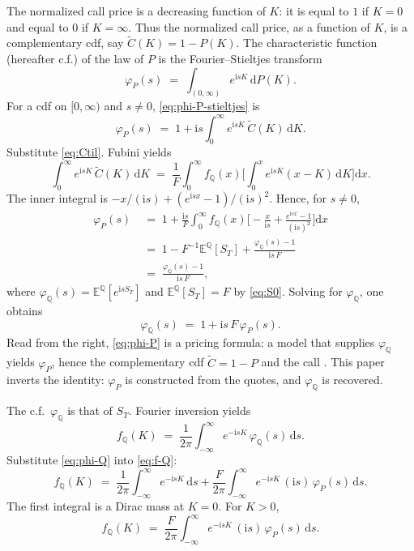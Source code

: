 \documentclass[preprint,12pt,authoryear,times]{elsarticle}
\newcommand{\E}{\mathbb{E}}
\newcommand{\Q}{\mathbb{Q}}
\begin{document}
The normalized call price is a decreasing function of \(K\): it is equal to \(1\) if \(K=0\) and equal to \(0\) if \(K=\infty\). Thus the normalized call price, as a function of \(K\), is a complementary cdf, say \(\tilde C(K)=1-P(K)\). The characteristic function (hereafter c.f.) of the law of \(P\) is the Fourier--Stieltjes transform
\begin{equation}
\label{eq:phi-P-stieltjes}
\varphi_P(s)
\;=\;
\int_{(0,\infty)}e^{\mathrm{i}s K}\,\mathrm{d}P(K).
\end{equation}
For a cdf on \([0,\infty)\) and \(s\neq 0\), \eqref{eq:phi-P-stieltjes} is
\begin{equation}
\varphi_P(s)
\;=\;
1+\mathrm{i}s\int_0^{\infty}e^{\mathrm{i}s K}\,\tilde C(K)\,\mathrm{d}K.
\end{equation}
Substitute \eqref{eq:Ctil}. Fubini yields
\[
\int_0^{\infty}e^{\mathrm{i}s K}\,\tilde C(K)\,\mathrm{d}K
\;=\;
\frac{1}{F}\int_0^{\infty}f_{\Q}(x)\Biggl[\int_0^x e^{\mathrm{i}s K}(x-K)\,\mathrm{d}K\Biggr]\mathrm{d}x.
\]
The inner integral is \(-x/(\mathrm{i}s)+(e^{\mathrm{i}s x}-1)/(\mathrm{i}s)^2\). Hence, for \(s\neq 0\),
\begin{align}
\varphi_P(s)
&\;=\;
1+\frac{\mathrm{i}s}{F}\int_0^{\infty}f_{\Q}(x)\Biggl[-\frac{x}{\mathrm{i}s}+\frac{e^{\mathrm{i}s x}-1}{(\mathrm{i}s)^2}\Biggr]\mathrm{d}x
\nonumber\\
&\;=\;
1-F^{-1}\E^{\Q}[S_T]+\frac{\varphi_{\Q}(s)-1}{\mathrm{i}s\,F}
\nonumber\\
&\;=\;
\frac{\varphi_{\Q}(s)-1}{\mathrm{i}s\,F},
\label{eq:phi-P}
\end{align}
where \(\varphi_{\Q}(s)=\E^{\Q}[e^{\mathrm{i}s S_T}]\) and \(\E^{\Q}[S_T]=F\) by \eqref{eq:S0}. Solving for \(\varphi_{\Q}\), one obtains
\begin{equation}
\label{eq:phi-Q}
\varphi_{\Q}(s)
\;=\;
1+\mathrm{i}s\,F\,\varphi_P(s).
\end{equation}
Read from the right, \eqref{eq:phi-P} is a pricing formula: a model that supplies \(\varphi_{\Q}\) yields \(\varphi_P\), hence the complementary cdf \(\tilde C=1-P\) and the call \citep{lewis2000}. This paper inverts the identity: \(\varphi_P\) is constructed from the quotes, and \(\varphi_{\Q}\) is recovered.

The c.f.\ \(\varphi_{\Q}\) is that of \(S_T\). Fourier inversion yields
\begin{equation}
\label{eq:f-Q}
f_{\Q}(K)
\;=\;
\frac{1}{2\pi}\int_{-\infty}^{\infty}e^{-\mathrm{i}s K}\,\varphi_{\Q}(s)\,\mathrm{d}s.
\end{equation}
Substitute \eqref{eq:phi-Q} into \eqref{eq:f-Q}:
\begin{equation}
\label{eq:f-Q-plug}
f_{\Q}(K)
\;=\;
\frac{1}{2\pi}\int_{-\infty}^{\infty}e^{-\mathrm{i}s K}\,\mathrm{d}s
+\frac{F}{2\pi}\int_{-\infty}^{\infty}e^{-\mathrm{i}s K}\,(\mathrm{i}s)\,\varphi_P(s)\,\mathrm{d}s.
\end{equation}
The first integral is a Dirac mass at \(K=0\). For \(K>0\),
\begin{equation}
\label{eq:f-Q-pos}
f_{\Q}(K)
\;=\;
\frac{F}{2\pi}\int_{-\infty}^{\infty}e^{-\mathrm{i}s K}\,(\mathrm{i}s)\,\varphi_P(s)\,\mathrm{d}s.
\end{equation}
\end{document}
